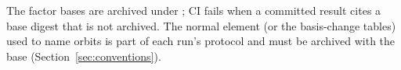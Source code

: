 The factor bases are archived under ;
CI fails when a committed result cites a base digest that is not
archived. The normal element (or the basis-change tables) used to
name orbits is part of each run's protocol and must be archived with
the base (Section~\ref{sec:conventions}).
